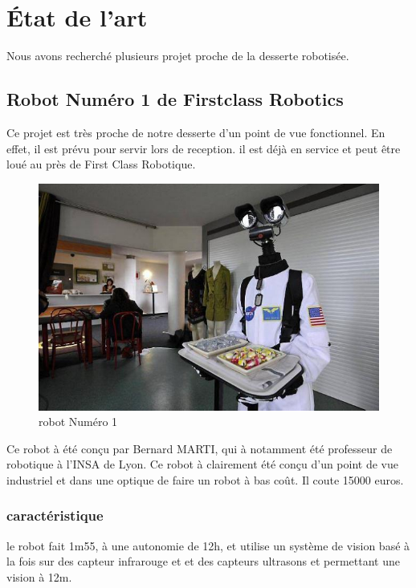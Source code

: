 \chapter{\'Etat de l'art}
Nous avons recherché plusieurs projet proche de la desserte robotisée.

\section{Robot Numéro 1 de Firstclass Robotics}
Ce projet est très proche de notre desserte d'un point de vue fonctionnel. En effet, il est prévu pour servir lors de reception. il est déjà en service et peut être loué au près de First Class Robotique. 

\begin{figure}[h]
\begin{center}
\includegraphics[scale=0.55]{Images/robot_n1.jpg}
\caption{robot Numéro 1}
\label{robot Numéro 1}
\end{center}
\end{figure} 

Ce robot à été conçu par Bernard MARTI, qui à notamment été professeur
de robotique à l'INSA de Lyon. Ce robot à clairement été conçu d'un
point de vue industriel et dans une optique de faire un robot à bas
coût. Il coute 15000 euros.

\subsection{caractéristique}
le robot fait 1m55, à une autonomie de 12h, et utilise un système de
vision basé à la fois sur des capteur infrarouge et et des capteurs
ultrasons et permettant une vision à 12m.

